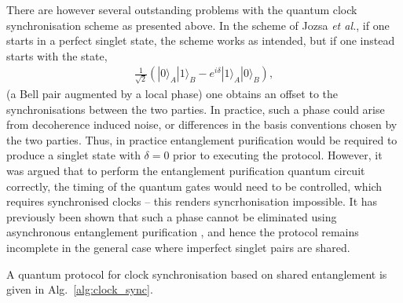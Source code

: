 There are however several outstanding problems with the quantum clock synchronisation scheme as presented above. In the scheme of Jozsa \textit{et al.}, if one starts in a perfect singlet state, the scheme works as intended, but if one instead starts with the state, 
\begin{align}
\frac{1}{\sqrt{2}} ( | 0 \rangle_A | 1 \rangle_B - e^{i \delta} | 1 \rangle_A | 0 \rangle_B ),
\end{align}
(a Bell pair augmented by a local phase) one obtains an offset to the synchronisations between the two parties. In practice, such a phase could arise from decoherence induced noise, or differences in the basis conventions chosen by the two parties. Thus, in practice entanglement purification would be required to produce a singlet state with \mbox{$\delta=0$} prior to executing the protocol. However, it was argued that to perform the entanglement purification quantum circuit correctly, the timing of the quantum gates would need to be controlled, which requires synchronised clocks \cite{bib:preskill2000quantum} --  this renders syncrhonisation impossible. It has previously been shown that such a phase cannot be eliminated using asynchronous entanglement purification \cite{bib:yurtsever02}, and hence the protocol remains incomplete in the general case where imperfect singlet pairs are shared.



A quantum protocol for clock synchronisation based on shared entanglement is given in Alg.~\ref{alg:clock_sync}.

